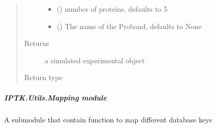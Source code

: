 \documentclass[letterpaper,10pt,english]{sphinxmanual}
\begin{document}
\begin{fulllineitems}
\begin{quote}
\begin{description}
\begin{itemize}
\item {} 
 (\sphinxstyleliteralemphasis{\sphinxupquote{, }}) \textendash{} number of proteins, defaults to 5

\item {} 
 (\sphinxstyleliteralemphasis{\sphinxupquote{, }}) \textendash{} The name of the Proband, defaults to None

\end{itemize}

\item[{Returns}] \leavevmode
a simulated experimental object

\item[{Return type}] \leavevmode
{\hyperref[\detokenize{IPTK.Classes:IPTK.Classes.Experiment.Experiment}]{}}

\end{description}\end{quote}

\end{fulllineitems}



\subparagraph{IPTK.Utils.Mapping module}
\label{\detokenize{IPTK.Utils:module-IPTK.Utils.Mapping}}\label{\detokenize{IPTK.Utils:iptk-utils-mapping-module}}
A submodule that contain function to map different database keys
\end{document}
